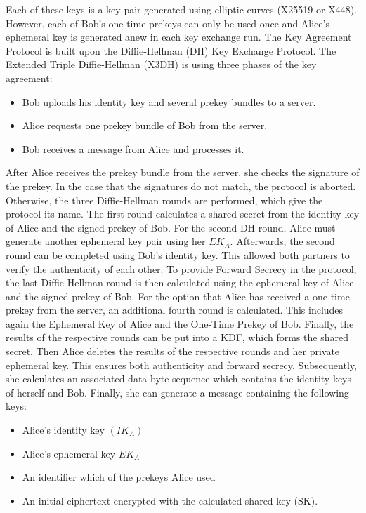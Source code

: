 \documentclass[12pt,oneside,a4paper,parskip]{scrbook}
\begin{document}
Each of these keys is a key pair generated using elliptic curves (X25519 or X448). However, each of Bob's one-time prekeys can only be used once and Alice's ephemeral key is generated anew in each key exchange run.
The Key Agreement Protocol is built upon the Diffie-Hellman (DH) Key Exchange Protocol. The Extended Triple Diffie-Hellman (X3DH) is using three phases of the key agreement:
\begin{itemize}
  \item Bob uploads his identity key and several prekey bundles to a server.
  \item Alice requests one prekey bundle of Bob from the server.
  \item Bob receives a message from Alice and processes it.
\end{itemize}

After Alice receives the prekey bundle from the server, she checks the signature of the prekey. In the case that the signatures do not match, the protocol is aborted.
Otherwise, the three Diffie-Hellman rounds are performed, which give the protocol its name. The first round calculates a shared secret from the identity key of Alice and the signed prekey of Bob. For the second DH round, Alice must generate another ephemeral key pair using her $ {EK_{A}} $. Afterwards, the second round can be completed using Bob's identity key. This allowed both partners to verify the authenticity of each other. To provide Forward Secrecy in the protocol, the last Diffie Hellman round is then calculated using the ephemeral key of Alice and the signed prekey of Bob. 
For the option that Alice has received a one-time prekey from the server, an additional fourth round is calculated. This includes again the Ephemeral Key of Alice and the One-Time Prekey of Bob.
Finally, the results of the respective rounds can be put into a KDF, which forms the shared secret. Then Alice deletes the results of the respective rounds and her private ephemeral key. This ensures both authenticity and forward secrecy. Subsequently, she calculates an associated data byte sequence which contains the identity keys of herself and Bob.
Finally, she can generate a message containing the following keys:
\begin{itemize}
  \item Alice's identity key $    (IK_{A})  $
  \item Alice's ephemeral key $   {EK_{A}}  $
  \item An identifier which of the prekeys Alice used
  \item An initial ciphertext encrypted with the calculated shared key (SK).
\end{itemize}
\end{document}
